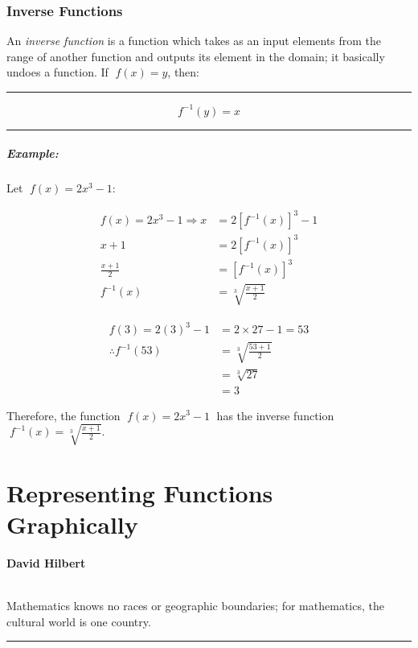 \documentclass[a5paper,9pt]{book}
\theoremstyle{definition}
\newcommand{\txtlinesur}[1]{%
    \vspace*{\baselineskip}

    \hrule%

    \vspace*{\medskipamount}

    #1

    \vspace*{\medskipamount}

    \hrule%

    \vspace*{\baselineskip}
}
\newcommand{\Rarr}{\Rightarrow}
\newcommand{\qq}[2]{%
    \begin{center}

        \begin{minipage}{0.75\textwidth}

          \hrulefill\hspace{2.5mm}\textbf{#2}\hspace{2.5mm}\hrulefill\medskip

          \hspace*{\fill}{\Large\textbf{``}}\hspace*{\fill} \\
          #1 \\[\baselineskip]
          \hspace*{\fill}{\Large\textbf{''}}\hspace*{\fill}

          \smallskip\hrule

        \end{minipage}

    \end{center}
}
\begin{document}
        \pagebreak

        \subsection{Inverse Functions}

        An \emph{inverse function} is a function which takes as an input elements from
        the range of another function and outputs its element in the domain; it basically
        undoes a function. If $\;f(x)=y$, then:

        \txtlinesur{%
            \begin{equation*}
                f^{-1}(y) = x
            \end{equation*}
        }

        \paragraph{Example:} Let $\;f(x)=2x^3-1$:

        \begin{align*}
            f(x)=2x^3-1\Rarr x &= 2{\left[f^{-1}(x)\right]}^3 - 1 \\[2.5pt]
            x+1 &= 2{\left[f^{-1}(x)\right]}^3 \\[2.5pt]
            \frac{x+1}{2} &= {\left[f^{-1}(x)\right]}^3 \\[2.5pt]
            f^{-1}(x) &= \sqrt[3]{\frac{x+1}{2}}
        \end{align*}

        \begin{align*}
            f(3) = 2{(3)}^3 - 1 &= 2\times 27 - 1 = 53 \\[6.5pt]
            \therefore f^{-1}(53) &= \sqrt[3]{\frac{53+1}{2}} \\[5pt]
                                  &= \sqrt[3]{27} \\[5pt]
                                  &= 3
        \end{align*}

        Therefore, the function $\;f(x)=2x^3-1\;$ has the inverse function $\;f^{-1}(x) = \sqrt[3]{\frac{x+1}{2}}$.

        \pagebreak

    \chapter{Representing Functions Graphically}%
        \label{chap:graphical_functions}
        \qq{Mathematics knows no races or geographic boundaries; for mathematics, the cultural world is one country.}
        {David Hilbert}
        \newpage
\end{document}
